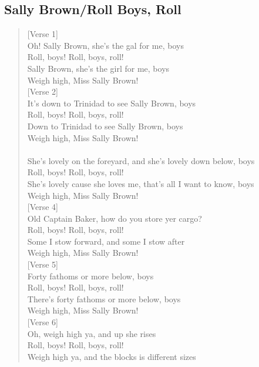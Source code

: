 \documentclass[11pt]{article}
\begin{document}
\subsection{Sally Brown/Roll Boys, Roll}
\label{sec:org255df01}
\begin{verse}
[Verse 1]\\
Oh! Sally Brown, she's the gal for me, boys\\
Roll, boys! Roll, boys, roll!\\
Sally Brown, she's the girl for me, boys\\
Weigh high, Miss Sally Brown!\\
\vspace*{1em}
[Verse 2]\\
It's down to Trinidad to see Sally Brown, boys\\
Roll, boys! Roll, boys, roll!\\
Down to Trinidad to see Sally Brown, boys\\
Weigh high, Miss Sally Brown!\\
[Verse 3]\\
She's lovely on the foreyard, and she's lovely down below, boys\\
Roll, boys! Roll, boys, roll!\\
She's lovely cause she loves me, that's all I want to know, boys\\
Weigh high, Miss Sally Brown!\\
\vspace*{1em}
[Verse 4]\\
Old Captain Baker, how do you store yer cargo?\\
Roll, boys! Roll, boys, roll!\\
Some I stow forward, and some I stow after\\
Weigh high, Miss Sally Brown!\\
\vspace*{1em}
[Verse 5]\\
Forty fathoms or more below, boys\\
Roll, boys! Roll, boys, roll!\\
There's forty fathoms or more below, boys\\
Weigh high, Miss Sally Brown!\\
\vspace*{1em}
[Verse 6]\\
Oh, weigh high ya, and up she rises\\
Roll, boys! Roll, boys, roll!\\
Weigh high ya, and the blocks is different sizes\\

\end{verse}
\end{document}
